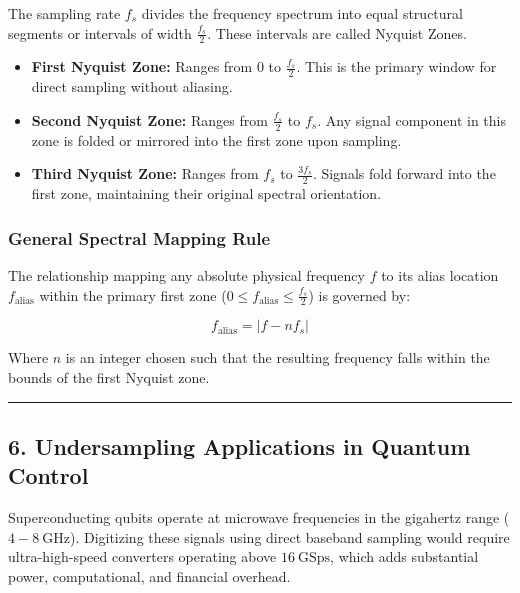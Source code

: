 \documentclass[
]{article}
\providecommand{\tightlist}{%
  \setlength{\itemsep}{0pt}\setlength{\parskip}{0pt}}
\begin{document}
The sampling rate \(f_s\) divides the frequency spectrum into equal
structural segments or intervals of width \(\frac{f_s}{2}\). These
intervals are called Nyquist Zones.

\begin{itemize}
\tightlist
\item
  \textbf{First Nyquist Zone:} Ranges from \(0\) to \(\frac{f_s}{2}\).
  This is the primary window for direct sampling without aliasing.
\item
  \textbf{Second Nyquist Zone:} Ranges from \(\frac{f_s}{2}\) to
  \(f_s\). Any signal component in this zone is folded or mirrored into
  the first zone upon sampling.
\item
  \textbf{Third Nyquist Zone:} Ranges from \(f_s\) to
  \(\frac{3f_s}{2}\). Signals fold forward into the first zone,
  maintaining their original spectral orientation.
\end{itemize}

\subsubsection{General Spectral Mapping
Rule}\label{general-spectral-mapping-rule}

The relationship mapping any absolute physical frequency \(f\) to its
alias location \(f_{\text{alias}}\) within the primary first zone
(\(0 \le f_{\text{alias}} \le \frac{f_s}{2}\)) is governed by:

\[f_{\text{alias}} = \left| f - n f_s \right|\]

Where \(n\) is an integer chosen such that the resulting frequency falls
within the bounds of the first Nyquist zone.

\begin{center}\rule{0.5\linewidth}{0.5pt}\end{center}

\subsection{6. Undersampling Applications in Quantum
Control}\label{undersampling-applications-in-quantum-control}

Superconducting qubits operate at microwave frequencies in the gigahertz
range (\(4 - 8\ \text{GHz}\)). Digitizing these signals using direct
baseband sampling would require ultra-high-speed converters operating
above \(16\ \text{GSps}\), which adds substantial power, computational,
and financial overhead.
\end{document}
